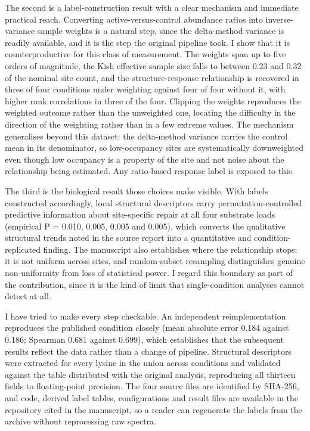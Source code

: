 \documentclass[11pt,a4paper]{letter}
\begin{document}
The second is a label-construction result with a clear mechanism and immediate practical reach. Converting active-versus-control abundance ratios into inverse-variance sample weights is a natural step, since the delta-method variance is readily available, and it is the step the original pipeline took. I show that it is counterproductive for this class of measurement. The weights span up to five orders of magnitude, the Kish effective sample size falls to between 0.23 and 0.32 of the nominal site count, and the structure-response relationship is recovered in three of four conditions under weighting against four of four without it, with higher rank correlations in three of the four. Clipping the weights reproduces the weighted outcome rather than the unweighted one, locating the difficulty in the direction of the weighting rather than in a few extreme values. The mechanism generalises beyond this dataset: the delta-method variance carries the control mean in its denominator, so low-occupancy sites are systematically downweighted even though low occupancy is a property of the site and not noise about the relationship being estimated. Any ratio-based response label is exposed to this.

The third is the biological result those choices make visible. With labels constructed accordingly, local structural descriptors carry permutation-controlled predictive information about site-specific repair at all four substrate loads (empirical P = 0.010, 0.005, 0.005 and 0.005), which converts the qualitative structural trends noted in the source report into a quantitative and condition-replicated finding. The manuscript also establishes where the relationship stops: it is not uniform across sites, and random-subset resampling distinguishes genuine non-uniformity from loss of statistical power. I regard this boundary as part of the contribution, since it is the kind of limit that single-condition analyses cannot detect at all.

I have tried to make every step checkable. An independent reimplementation reproduces the published condition closely (mean absolute error 0.184 against 0.186; Spearman 0.681 against 0.699), which establishes that the subsequent results reflect the data rather than a change of pipeline. Structural descriptors were extracted for every lysine in the union across conditions and validated against the table distributed with the original analysis, reproducing all thirteen fields to floating-point precision. The four source files are identified by SHA-256, and code, derived label tables, configurations and result files are available in the repository cited in the manuscript, so a reader can regenerate the labels from the archive without reprocessing raw spectra.
\end{document}
